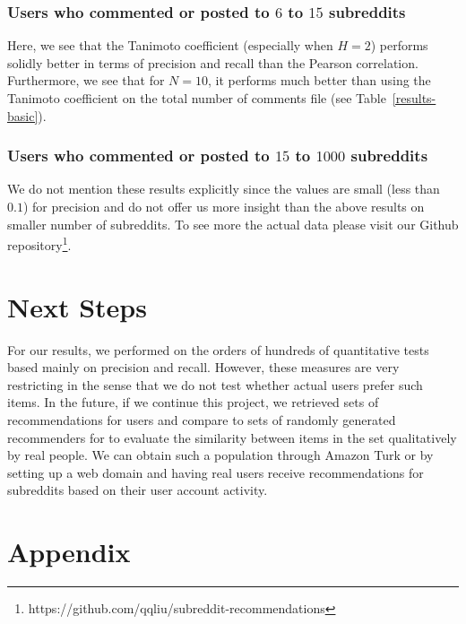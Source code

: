 \documentclass{article}
\begin{document}
\subsubsection{Users who commented or posted to $6$ to $15$ subreddits}\label{6-15-users}

Here, we see that the Tanimoto coefficient (especially when $H = 2$) performs solidly 
better in terms of precision and recall than the Pearson correlation. Furthermore, we see
that for $N = 10$, it performs much better than using the Tanimoto coefficient on the 
total number of comments file (see Table~\ref{results-basic}). 

\subsubsection{Users who commented or posted to $15$ to $1000$ subreddits}\label{15-1000-users}

We do not mention these results explicitly since the values are small (less than $0.1$) for precision and
do not offer us more insight than the above results on smaller number of subreddits. To see more the actual data
please visit our Github repository\footnote{https://github.com/qqliu/subreddit-recommendations}.

\section{Next Steps}\label{sec:qualitative-evaluations}

For our results, we performed on the orders of hundreds of quantitative tests based mainly 
on precision and recall. However, these measures are very restricting in the sense that 
we do not test whether actual users prefer such items. 
In the future, if we continue this project, we retrieved sets of 
 recommendations for users and compare to sets of randomly
generated recommenders for to evaluate the similarity between items in the set qualitatively by 
real people. We can obtain such a population through Amazon Turk or by setting
up a web domain and having real users receive recommendations for subreddits
based on their user account activity. 

\section*{Appendix}
\end{document}
